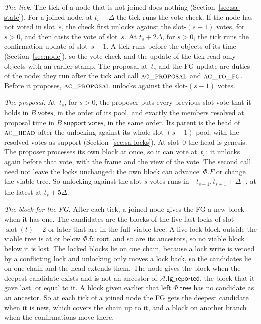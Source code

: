 \documentclass{article}
\newcommand{\slot}{\operatorname{slot}}
\newcommand{\AC}{\mathcal A}
\newcommand{\Fr}{\Phi}
\newcommand{\tree}{\mathsf{tree}}
\newcommand{\fcroot}{\mathsf{fc\_root}}
\newcommand{\fgReported}{\mathsf{fg\_reported}}
\begin{document}
\emph{The tick.}  The tick of a node that is not joined does nothing
(Section~\ref{sec:sa-state}).  For a joined node, at $t_s+\Delta$ the tick
runs the vote check.  If the node has not voted in slot~$s$, the check
first unlocks against the slot-$(s-1)$ votes, for $s>0$, and then casts
the vote of slot~$s$.  At
$t_s+2\Delta$, for $s>0$, the tick runs the confirmation update of
slot~$s-1$.  A tick runs before the objects of its time
(Section~\ref{sec:node}), so the vote check and the update of the tick
read only objects with an earlier stamp.  The
proposal at~$t_s$ and the FG update are duties of the node; they run after
the tick and call $\Call{ac\_proposal}{}$ and $\Call{ac\_to\_fg}{}$.
Before it proposes, $\Call{ac\_proposal}{}$ unlocks against the
slot-$(s-1)$ votes.

\emph{The proposal.}  At~$t_s$, for $s>0$, the proposer puts every
previous-slot vote that it holds in $B.\mathsf{votes}$, in the order of its
pool, and exactly the members resolved at proposal time in
$B.\mathsf{support\_votes}$, in the same order.  Its parent is the head of
$\Call{ac\_head}{}$ after the unlocking against its whole slot-$(s-1)$
pool, with the resolved votes as support (Section~\ref{sec:sa-locks}).
At slot~$0$ the head is genesis.  The proposer processes its own block at
once, so it can vote at~$t_s$; it unlocks again before that vote, with
the frame and the view of the vote.  The second call need not leave the
locks unchanged: the own block can advance~$\Fr.F$ or change the viable
tree.  So unlocking against the slot-$s$ votes runs in
$[t_{s+1},t_{s+1}+\Delta]$, at the latest at $t_s+5\Delta$.

\emph{The block for the FG.}  After each tick, a joined node gives the FG
a new block when it has one.  The candidates are the blocks of the live
fast locks of slot $\slot(t)-2$ or later that are in the full viable
tree.  A live lock block outside the viable tree is at or below
$\Fr.\fcroot$, and so are its ancestors, so no viable block below it is
lost.  The locked blocks lie on one chain, because a lock
write is vetoed by a conflicting lock and unlocking only moves a lock
back, so the candidates lie on one chain and the head extends them.  The node gives the block when the deepest candidate exists and is
not an ancestor of $\AC.\fgReported$, the block that it gave last, or
equal to it.  A block given earlier that left $\Fr.\tree$ has no
candidate as an ancestor.  So at each tick of a joined node the FG gets
the deepest candidate when it is new, which covers the chain up to it, and
a block on another branch when the confirmations move there.
\end{document}
